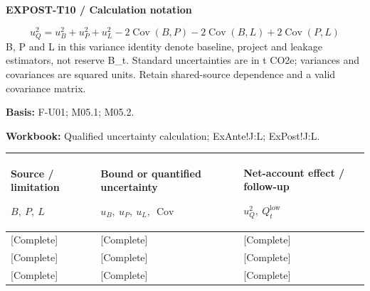 \par\begingroup\sffamily\fontsize{8}{10}\selectfont\color{NEBGreen}\setlength{\parskip}{2pt}\setlength{\abovedisplayskip}{4pt}\setlength{\belowdisplayskip}{4pt}\setlength{\abovedisplayshortskip}{2pt}\setlength{\belowdisplayshortskip}{3pt}
\textbf{EXPOST-T10 / Calculation notation}\par
{\fontsize{9}{11}\selectfont\[ u_Q^2=u_B^2+u_P^2+u_L^2-2\operatorname{Cov}(B,P)-2\operatorname{Cov}(B,L)+2\operatorname{Cov}(P,L) \]}
B, P and L in this variance identity denote baseline, project and leakage estimators, not reserve B\_t. Standard uncertainties are in t CO2e; variances and covariances are squared units. Retain shared-source dependence and a valid covariance matrix.\par
\textbf{Basis:} F-U01; M05.1; M05.2.\par
\textbf{Workbook:} Qualified uncertainty calculation; ExAnte!J:L; ExPost!J:L.\par\endgroup
{\sffamily\fontsize{8.3}{10.3}\selectfont\begin{longtable}{@{}P{54.83mm} P{54.83mm} P{54.83mm}@{}}
\toprule
\textbf{Source / limitation}\par {\normalfont\fontsize{8.2}{10}\selectfont $B,\ P,\ L$} & \textbf{Bound or quantified uncertainty}\par {\normalfont\fontsize{8.2}{10}\selectfont $u_B,\ u_P,\ u_L,\ \operatorname{Cov}$} & \textbf{Net-account effect / follow-up}\par {\normalfont\fontsize{8.2}{10}\selectfont $u_Q^2,\ Q_t^{\mathrm{low}}$}\\\midrule\endhead
\rule{0pt}{8mm}[Complete] & [Complete] & [Complete]\\\hline
\rule{0pt}{8mm}[Complete] & [Complete] & [Complete]\\\hline
\rule{0pt}{8mm}[Complete] & [Complete] & [Complete]\\\hline
\end{longtable}}
\par\begingroup\sffamily\fontsize{8}{10}\selectfont\color{NEBGreen}\setlength{\parskip}{2pt}\setlength{\abovedisplayskip}{4pt}\setlength{\belowdisplayskip}{4pt}\setlength{\abovedisplayshortskip}{2pt}\setlength{\belowdisplayshortskip}{3pt}
